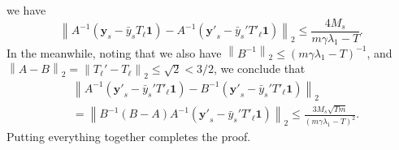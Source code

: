 \documentclass[letterpaper]{article} %
\begin{document}
	we have
	\begin{equation*}
	\left\| A^{-1}\left(\mathbf{y}_s-\bar{y}_sT_\ell\mathbf{1}\right)-A^{-1}\left(\mathbf{y'}_s-\bar{y}_s'T'_\ell\mathbf{1}\right) \right\|_2\leq \frac{4M_s}{m\gamma\lambda_1-T}.
	\end{equation*}
	In the meanwhile, noting that we also have $\left\| B^{-1} \right\|_2\leq \left( m\gamma\lambda_1-T \right)^{-1}$, and $\left\| A-B \right\|_2=\left\| T_{\ell}'-T_{\ell} \right\|_2 \leq \sqrt{2}<3/2$, we conclude that
	\begin{equation*}
	\begin{aligned}
	&\left\| A^{-1}\left(\mathbf{y'}_s-\bar{y}_s'T'_\ell\mathbf{1}\right)-B^{-1}\left(\mathbf{y'}_s-\bar{y}_s'T'_\ell\mathbf{1}\right) \right\|_2\\
	&=\left\| B^{-1} \left( B-A \right) A^{-1}\left(\mathbf{y'}_s-\bar{y}_s'T'_\ell\mathbf{1}\right)\right\|_2\leq \frac{3M_s\sqrt{Tm}}{\left( m\gamma\lambda_1-T \right)^2}.
	\end{aligned}
	\end{equation*}
	Putting everything together completes the proof.
	
	
	
\end{document}
